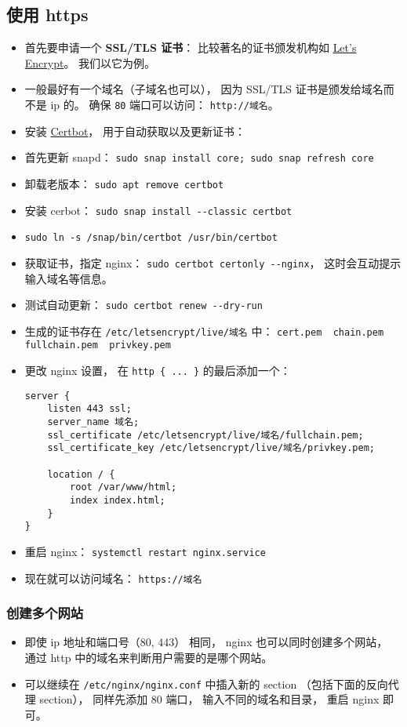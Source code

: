 \subsection{使用 https}
\begin{itemize}
\item 首先要申请一个 \textbf{SSL/TLS 证书}： 比较著名的证书颁发机构如 \href{https://letsencrypt.org/}{Let's Encrypt}。 我们以它为例。
\item 一般最好有一个域名（子域名也可以）， 因为 SSL/TLS 证书是颁发给域名而不是 ip 的。 确保 \verb|80| 端口可以访问： \verb|http://域名|。
\item 安装 \href{https://certbot.eff.org/instructions?ws=nginx&os=ubuntufocal}{Certbot}， 用于自动获取以及更新证书：
\item 首先更新 snapd： \verb|sudo snap install core; sudo snap refresh core|
\item 卸载老版本： \verb|sudo apt remove certbot|
\item 安装 cerbot： \verb|sudo snap install --classic certbot|
\item \verb|sudo ln -s /snap/bin/certbot /usr/bin/certbot|
\item 获取证书，指定 nginx： \verb|sudo certbot certonly --nginx|， 这时会互动提示输入域名等信息。
\item 测试自动更新： \verb|sudo certbot renew --dry-run|
\item 生成的证书存在 \verb|/etc/letsencrypt/live/域名| 中： \verb|cert.pem  chain.pem  fullchain.pem  privkey.pem|
\item 更改 nginx 设置， 在 \verb|http { ... }| 的最后添加一个：
\begin{lstlisting}[language=none]
server {
    listen 443 ssl;
    server_name 域名;
    ssl_certificate /etc/letsencrypt/live/域名/fullchain.pem;
    ssl_certificate_key /etc/letsencrypt/live/域名/privkey.pem;

    location / {
        root /var/www/html;
        index index.html;
    }
}
\end{lstlisting}
\item 重启 nginx： \verb|systemctl restart nginx.service|
\item 现在就可以访问域名： \verb|https://域名|
\end{itemize}

\subsubsection{创建多个网站}
\begin{itemize}
\item 即使 ip 地址和端口号（80, 443） 相同， nginx 也可以同时创建多个网站， 通过 http 中的域名来判断用户需要的是哪个网站。
\item 可以继续在 \verb|/etc/nginx/nginx.conf| 中插入新的 section （包括下面的反向代理 section）， 同样先添加 80 端口， 输入不同的域名和目录， 重启 nginx 即可。
\end{itemize}


